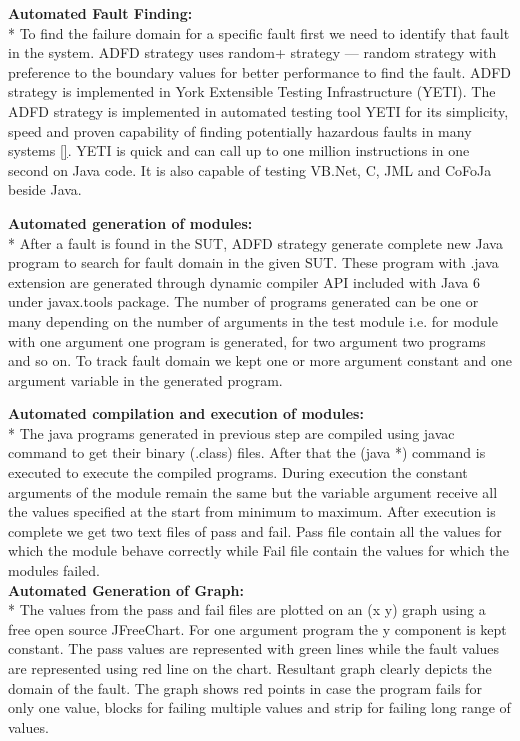 \documentclass{acm_proc_article-sp}
\begin{document}
\noindent \textbf{Automated Fault Finding:}\\*
\indent To find the failure domain for a specific fault first we need to identify that fault in the system. ADFD strategy uses random+ strategy --- random strategy with preference to the boundary values for better performance to find the fault. ADFD strategy is implemented in York Extensible Testing Infrastructure (YETI). The ADFD strategy is implemented in automated testing tool YETI for its simplicity, speed and proven capability of finding potentially hazardous faults in many systems \ref{}. YETI is quick and can call up to one million instructions in one second on Java code. It is also capable of testing VB.Net, C, JML and CoFoJa beside Java. 


\noindent \textbf{Automated generation of modules:}\\*
\indent  After a fault is found in the SUT, ADFD strategy generate complete new Java program to search for fault domain in the given SUT.  These program with .java extension are generated through dynamic compiler API included with Java 6 under javax.tools package. The number of programs generated can be one or many depending on the number of arguments in the test module i.e. for module with one argument one program is generated, for two argument two programs and so on.
To track fault domain we kept one or more argument constant and one argument variable in the generated program.

\noindent \textbf{Automated compilation and execution of modules:}\\*
\indent  The java programs generated in previous step are compiled using javac command to get their binary (.class) files. After that the (java *) command is executed to execute the compiled programs. During execution the constant arguments of the module remain the same but the variable argument receive all the values specified at the start from minimum to maximum. After execution is complete we get two text files of pass and fail. Pass file contain all the values for which the module behave correctly while Fail file contain the values for which the modules failed.\\

\noindent \textbf{Automated Generation of Graph:}\\*
\indent The values from the pass and fail files are plotted on an (x y) graph using a free open source JFreeChart. For one argument program the y component is kept constant. The pass values are represented with green lines while the fault values are represented using red line on the chart.  Resultant graph clearly depicts the domain of the fault. The graph shows red points in case the program fails for only one value, blocks for failing multiple values and strip for failing long range of values.\\
\end{document}

